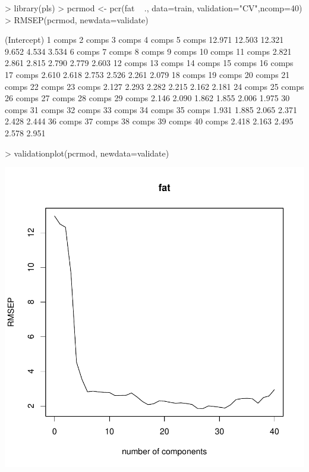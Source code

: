 \documentclass[letterpaper]{article}
\begin{document}
\begin{Schunk}
\begin{Sinput}
> library(pls)
> pcrmod <- pcr(fat ~ ., data=train, validation="CV",ncomp=40)
> RMSEP(pcrmod, newdata=validate)
\end{Sinput}
\begin{Soutput}
(Intercept)      1 comps      2 comps      3 comps      4 comps      5 comps  
     12.971       12.503       12.321        9.652        4.534        3.534  
    6 comps      7 comps      8 comps      9 comps     10 comps     11 comps  
      2.821        2.861        2.815        2.790        2.779        2.603  
   12 comps     13 comps     14 comps     15 comps     16 comps     17 comps  
      2.610        2.618        2.753        2.526        2.261        2.079  
   18 comps     19 comps     20 comps     21 comps     22 comps     23 comps  
      2.127        2.293        2.282        2.215        2.162        2.181  
   24 comps     25 comps     26 comps     27 comps     28 comps     29 comps  
      2.146        2.090        1.862        1.855        2.006        1.975  
   30 comps     31 comps     32 comps     33 comps     34 comps     35 comps  
      1.931        1.885        2.065        2.371        2.428        2.444  
   36 comps     37 comps     38 comps     39 comps     40 comps  
      2.418        2.163        2.495        2.578        2.951  
\end{Soutput}
\begin{Sinput}
> validationplot(pcrmod, newdata=validate)
\end{Sinput}
\end{Schunk}
\includegraphics{HW05Key-pcr}
\end{document}
